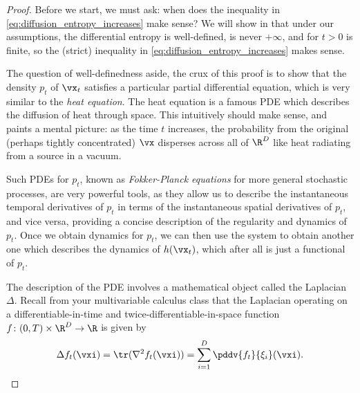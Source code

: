 \documentclass[../../book-main.tex]{subfiles}
\begin{document}
\begin{proof}
    Before we start, we must ask: when does the inequality in \eqref{eq:diffusion_entropy_increases} make sense? We will show in  that under our assumptions, the differential entropy is well-defined, is never \(+\infty\), and for \(t > 0\) is finite, so the (strict) inequality in \eqref{eq:diffusion_entropy_increases} makes sense.

    The question of well-definedness aside, the crux of this proof is to show that the density \(p_{t}\) of \(\vx_{t}\) satisfies a particular partial differential equation, which is very similar to the \textit{heat equation}. The heat equation is a famous PDE which describes the diffusion of heat through space. This intuitively should make sense, and paints a mental picture: as the time \(t\) increases, the probability from the original (perhaps tightly concentrated) \(\vx\) disperses across all of \(\R^{D}\) like heat radiating from a source in a vacuum.
    
    Such PDEs for \(p_{t}\), known as \textit{Fokker-Planck equations} for more general stochastic processes, are very powerful tools, as they allow us to describe the instantaneous temporal derivatives of \(p_{t}\) in terms of the instantaneous spatial derivatives of \(p_{t}\), and vice versa, providing a concise description of the regularity and dynamics of \(p_{t}\). Once we obtain dynamics for \(p_{t}\), we can then use the system to obtain another one which describes the dynamics of \(h(\vx_{t})\), which after all is just a functional of \(p_{t}\).  

    The description of the PDE involves a mathematical object called the Laplacian \(\Delta\). Recall from your multivariable calculus class that the Laplacian operating on a differentiable-in-time and twice-differentiable-in-space function \(f \colon (0, T) \times \R^{D} \to \R\) is given by
    \begin{equation}
        \Delta f_{t}(\vxi) = \tr(\nabla^{2}f_{t}(\vxi)) = \sum_{i = 1}^{D}\pddv{f_{t}}{\xi_{i}}(\vxi).
    \end{equation}
    

\end{proof}
\end{document}
